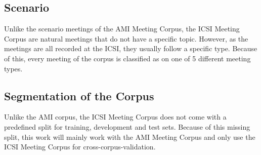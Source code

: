 \subsection{Scenario}

Unlike the scenario meetings of the AMI Meeting Corpus, the ICSI Meeting Corpus are natural meetings that do not have a specific topic.
However, as the meetings are all recorded at the ICSI, they usually follow a specific type.
Because of this, every meeting of the corpus is classified as on one of 5 different meeting types. \cite{Janin}

\subsection{Segmentation of the Corpus}\label{ssec:icsi-segmentation-of-the-corpus}

Unlike the AMI corpus, the ICSI Meeting Corpus does not come with a predefined split for training, development and test sets.
Because of this missing split, this work will mainly work with the AMI Meeting Corpus and only use the ICSI Meeting Corpus for cross-corpus-validation.